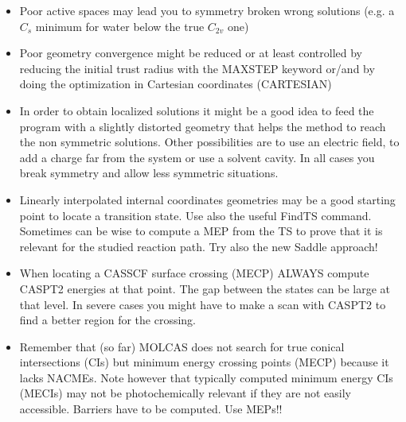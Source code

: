 
\begin{itemize}
\item Poor active spaces may lead you to symmetry broken wrong solutions (e.g. a $C_s$ minimum 
for water below the true $C_{2v}$ one) 
\item Poor geometry convergence might be reduced or at least controlled by reducing the initial 
trust radius with the MAXSTEP keyword or/and by doing the optimization in Cartesian 
coordinates (CARTESIAN) 
\item In order to obtain localized solutions it might be a good idea to feed the program with a 
slightly distorted geometry that helps the method to reach the non symmetric solutions. 
Other possibilities are to use an electric field, to add a charge far from the system or use a  solvent cavity. In all cases you break symmetry and allow less symmetric situations. 
\end{itemize}


\begin{itemize}
\item Linearly interpolated internal coordinates geometries may be a good starting point to locate 
a transition state. Use also the useful FindTS command. Sometimes can be wise to compute 
a MEP from the TS to prove that it is relevant for the studied reaction path. Try also the new 
Saddle approach! 
\item When locating a CASSCF surface crossing (MECP) ALWAYS compute CASPT2 energies 
at that point. The gap between the states can be large at that level. In severe cases you might have to make a scan with CASPT2 to find a better region for the crossing. 
\item Remember that (so far) MOLCAS does not search for true conical intersections (CIs) but 
minimum energy crossing points (MECP) because it lacks NACMEs. Note however that 
typically computed minimum energy CIs (MECIs) may not be photochemically relevant 
if they are not easily accessible. Barriers have to be computed. Use MEPs!! 
\end{itemize}



